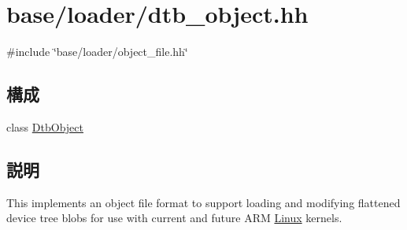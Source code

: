 \hypertarget{dtb__object_8hh}{
\section{base/loader/dtb\_\-object.hh}
\label{dtb__object_8hh}
}
{\ttfamily \#include \char`\"{}base/loader/object\_\-file.hh\char`\"{}}\par
\subsection*{構成}
\begin{DoxyCompactItemize}
\item 
class \hyperlink{classDtbObject}{DtbObject}
\end{DoxyCompactItemize}


\subsection{説明}
This implements an object file format to support loading and modifying flattened device tree blobs for use with current and future ARM \hyperlink{classLinux}{Linux} kernels. 